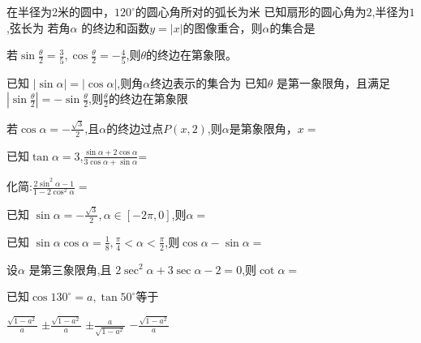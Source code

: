 \documentclass[12pt,answers]{exam}
\begin{document}
\pagestyle{plain}
\begin{center}
{}
\end{center}

\begin{questions}
\question 
在半径为2米的圆中，$120^{\circ}$的圆心角所对的弧长为米
\question 
已知扇形的圆心角为$2$,半径为$1$,弦长为\fillin[$2\sin{1}$]
\question 
若角$\alpha$ 的终边和函数$y=|x|$的图像重合，则$\alpha$的集合是\\
\fillin[$\displaystyle \left\{ \alpha\mid \alpha =\frac{\pi}{4}+2k\pi,k\in Z \right\} \cup \left\{ \alpha\mid \alpha=\frac{3\pi}{4}+2k\pi,k\in Z \right\}$][10cm]

\question 
若$\displaystyle \sin{\frac{\theta}{2}}=\frac{3}{5},\cos{\frac{\theta}{2}}=-\frac{4}{5}$,则$\theta$的终边在第\fillin[四]象限。

\question 
已知 $|\sin{\alpha}|=|\cos{\alpha}|$,则角$\alpha$终边表示的集合为\fillin[$\displaystyle \left\{ \alpha\mid \alpha=\frac{\pi}{4}+\frac{k\pi}{2},k\in Z\right\}$][5cm]
\question 
已知$\theta$ 是第一象限角，且满足$\displaystyle |\sin{\frac{\theta}{2}}|=-\sin{\frac{\theta}{2}}$,则$\frac{\theta}{2}$的终边在第\fillin[三]象限

\question 
若$\displaystyle \cos{\alpha}=-\frac{\sqrt{3}}{2}$,且$\alpha$的终边过点$P(x,2)$,则$\alpha$是第\fillin[二]象限角，$x=$ \fillin[$-2\sqrt{3}$]

\question 

已知$\tan{\alpha}=3$,$\displaystyle \frac{\sin{\alpha}+2\cos{\alpha}}{3\cos{\alpha}+\sin{\alpha}}$=

\question 
化简:$\displaystyle \frac{2\sin^2{\alpha}-1}{1-2\cos^2{\alpha}}=$ \fillin[$1$]

\question 
已知 $\displaystyle \sin{\alpha}=-\frac{\sqrt{3}}{2},\alpha \in [-2\pi,0]$,则$\alpha=$ 

\question 
已知 $\displaystyle \sin{\alpha}\cos{\alpha}=\frac{1}{8},\frac{\pi}{4}<\alpha<\frac{\pi}{2}$,则$\cos{\alpha}-\sin{\alpha}=$ 

\question 
设$\alpha$ 是第三象限角,且 $2\sec^2{\alpha}+3\sec{\alpha}-2=0$,则$\cot{\alpha}=$ 

\question 
已知$\cos{130^\circ}=a,\tan{50^\circ}$等于\fillin[D]\\
\begin{oneparchoices}
\choice $\displaystyle \frac{\sqrt{1-a^2}}{a}$
\choice $\displaystyle \pm \frac{\sqrt{1-a^2}}{a}$ 
\choice $\displaystyle \pm \frac{a}{\sqrt{1-a^2}}$
\choice $\displaystyle -\frac{\sqrt{1-a^2}}{a}$ 
\end{oneparchoices}


\end{questions}
\end{document}
